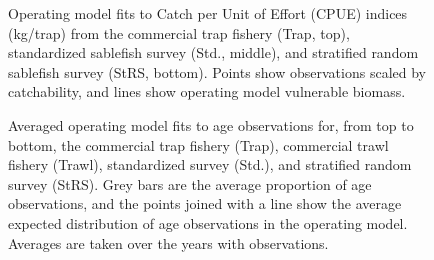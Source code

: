 \documentclass[11pt]{book}
\begin{document}
\begin{figure}[htb]

{\centering {} 

}

\caption{Operating model fits to Catch per Unit of Effort (CPUE) indices (kg/trap) from the commercial trap fishery (Trap, top), standardized sablefish survey (Std., middle), and stratified random sablefish survey (StRS, bottom). Points show observations scaled by catchability, and lines show operating model vulnerable biomass.}\label{fig:unnamed-chunk-18}
\end{figure}
\newpage
\begin{figure}[htb]

{\centering {} 

}

\caption{Averaged operating model fits to age observations for, from top to bottom, the commercial trap fishery (Trap), commercial trawl fishery (Trawl), standardized survey (Std.), and stratified random survey (StRS). Grey bars are the average proportion of age observations, and the points joined with a line show the average expected distribution of age observations in the operating model. Averages are taken over the years with observations.}\label{fig:unnamed-chunk-19}
\end{figure}
\newpage
\end{document}
